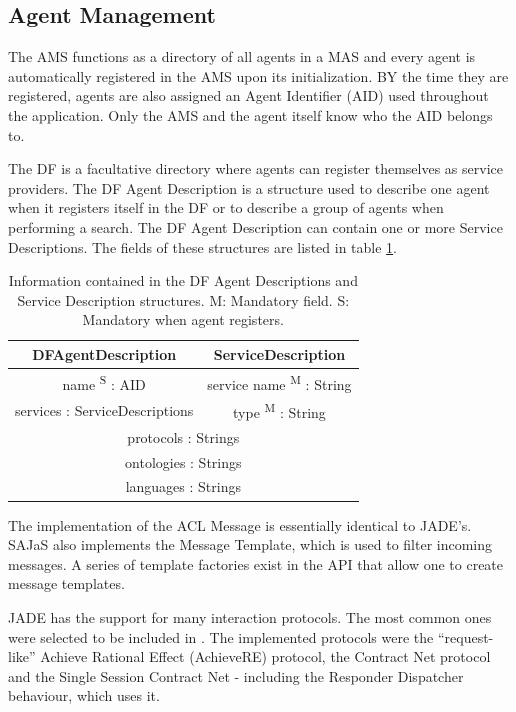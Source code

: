 \subsection{Agent Management}
The AMS functions as a directory of all agents in a MAS and every agent is automatically registered in the AMS upon its initialization. BY the time they are registered, agents are also assigned an Agent Identifier (AID) used throughout the application. Only the AMS and the agent itself know who the AID belongs to.

The DF is a facultative directory where agents can register themselves as service providers. The DF Agent Description is a structure used to describe one agent when it registers itself in the DF or to describe a group of agents when performing a search. The DF Agent Description can contain one or more Service Descriptions. The fields of these structures are listed in table \ref{tab:dfAgentDescription}.

\begin{table}[h]
	\normalsize
	\caption[The DF Agent Descriptions and the Service Description]{Information contained in the DF Agent Descriptions and Service Description structures.
	M: Mandatory field. S: Mandatory when agent registers.}
	\label{tab:dfAgentDescription}
	\begin{center}
		\begin{tabular}{c|c}
		\hline
		\textbf{DFAgentDescription} & \textbf{ServiceDescription} \\
		\hline
		name \textsuperscript{S} : AID & service name \textsuperscript{M} : String \\
		\hline
		services : ServiceDescriptions & type \textsuperscript{M} : String \\
		\hline
		\multicolumn{2}{c}{protocols : Strings} \\
		\hline
		\multicolumn{2}{c}{ontologies : Strings} \\
		\hline
		\multicolumn{2}{c}{languages : Strings} \\
		\hline
		\end{tabular}
	\end{center}
\end{table} 

The implementation of the ACL Message is essentially identical to JADE's. SAJaS also implements the Message Template, which is used to filter incoming messages. A series of template factories exist in the API that allow one to create message templates. 

JADE has the support for many interaction protocols. The most common ones were selected to be included in \apiname{}.
The implemented protocols were the ``request-like'' Achieve Rational Effect (AchieveRE) protocol, the Contract Net protocol and the Single Session Contract Net - including the Responder Dispatcher behaviour, which uses it.

